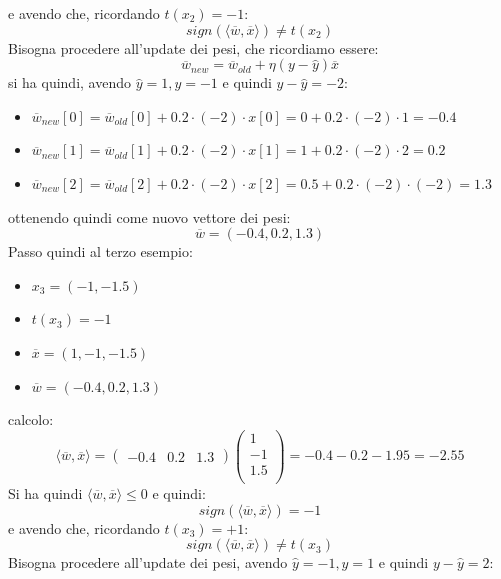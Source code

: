 \begin{esercizio}
						e avendo che, ricordando $t(x_2)=-1$:
						\[sign(\langle \overline{w}, \overline{x}\rangle)\neq t(x_2)\]
						Bisogna procedere all'update dei pesi, che ricordiamo essere:
						\[\overline{w}_{new}=\overline{w}_{old}+\eta(y-\hat{y})\overline{x}\]
						\newpage
						si ha quindi, avendo $\hat{y}=1, y=-1$ e quindi $y-\hat{y}=-2$:
						\begin{itemize}
							\item
							      $\overline{w}_{new}[0]=\overline{w}_{old}[0]+0.2\cdot (-2)\cdot
							      x[0]=0+0.2\cdot(-2)\cdot 1=-0.4$ 
							\item
							      $\overline{w}_{new}[1]=\overline{w}_{old}[1]+0.2\cdot (-2)\cdot
							      x[1]=1+0.2\cdot(-2)\cdot 2=0.2$ 
							\item
							      $\overline{w}_{new}[2]=\overline{w}_{old}[2]+0.2\cdot (-2)\cdot x[2]=0.5+0.2
							      \cdot(-2)\cdot(-2)=1.3$    
						\end{itemize}
						ottenendo quindi come nuovo vettore dei pesi:
						\[\overline{w}=(-0.4, 0.2, 1.3)\]
						Passo quindi al terzo esempio:
						\begin{itemize}
							\item $x_3=(-1,-1.5)$
							\item $t(x_3)=-1$
							\item $\overline{x}=(1,-1,-1.5)$
							\item $\overline{w}=(-0.4, 0.2, 1.3)$
						\end{itemize}
						calcolo:
						\[\langle \overline{w}, \overline{x}\rangle=
							\left(\begin{matrix}
							-0.4 & 0.2 & 1.3
							\end{matrix}\right)
							\left(
							\begin{matrix}
								1   \\
								-1  \\
								1.5 \\
							\end{matrix}
							\right)= -0.4-0.2-1.95 = -2.55
						\]
						Si ha quindi $\langle \overline{w}, \overline{x}\rangle \leq 0$ e quindi:
						\[sign(\langle \overline{w}, \overline{x}\rangle)=-1\]
						e avendo che, ricordando $t(x_3)=+1$:
						\[sign(\langle \overline{w}, \overline{x}\rangle)\neq t(x_3)\]
						Bisogna procedere all'update dei pesi, avendo $\hat{y}=-1, y=1$ e quindi
						$y-\hat{y}=2$:
\end{esercizio}
